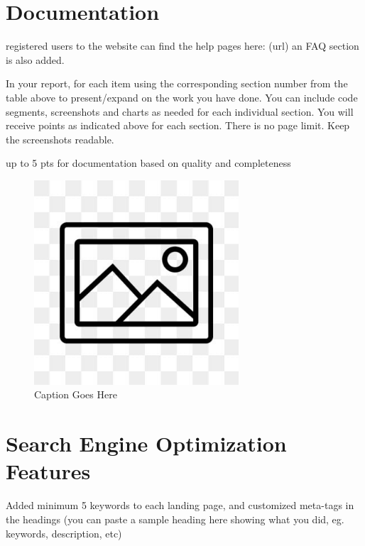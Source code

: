 \documentclass[12pt, letterpaper]{article}
\begin{document}
 \newpage

\section{Documentation}
registered users to the website can find the help pages here: (url) an FAQ section is also added.

In your report, for each item using the corresponding section number from the table above to present/expand on the work you have done. You can include code segments, screenshots and charts as needed for each individual section. You will receive points as indicated above for each section. There is no page limit. Keep the screenshots readable.

up to 5 pts for documentation based on quality and completeness

\begin{figure}[htbp]
	\centering
	\includegraphics[width=3in]{images/placeholder.jpg}
	\caption{Caption Goes Here}
 \end{figure}

 \newpage

\section{Search Engine Optimization Features}
Added minimum 5 keywords to each landing page, and customized meta-tags in the headings (you can paste a sample heading here showing what you did, eg. keywords, description, etc)
\end{document}
